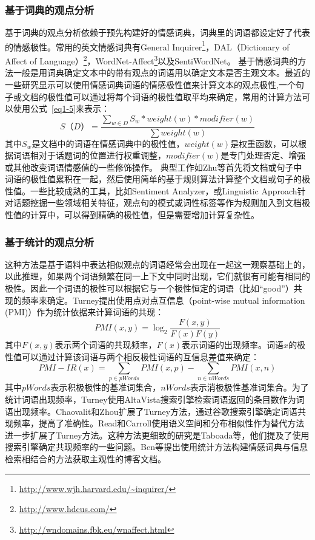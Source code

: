 \subsubsection{基于词典的观点分析}
基于词典的观点分析依赖于预先构建好的情感词典，词典里的词语都设定好了代表的情感极性。常用的英文情感词典有General Inquirer\footnote{\url{http://www.wjh.harvard.edu/~inquirer/}}，DAL（Dictionary of Affect of Language）\footnote{\url{http://www.hdcus.com/}}，WordNet-Affect\footnote{\url{http://wndomains.fbk.eu/wnaffect.html}}以及SentiWordNet。
基于情感词典的方法一般是用词典确定文本中的带有观点的词语用以确定文本是否主观文本。最近的一些研究显示可以使用情感词典词语的情感极性值来计算文本的观点极性,一个句子或文档的极性值可以通过将每个词语的极性值取平均来确定，常用的计算方法可以使用公式~\ref{eq1-5}来表示：
\begin{equation}
\label{eq1-5}
S（D）=\dfrac{\sum_{w \in D}S_w \ast weight(w) \ast modifier(w)}{\sum weight(w)}
\end{equation}
其中$ S_w $是文档中的词语在情感词典中的极性值，$ weight(w) $是权重函数，可以根据词语相对于话题词的位置进行权重调整，$ modifier(w) $是专门处理否定、增强或其他改变词语情感值的一些修饰操作。
典型工作如Zhu等首先将文档或句子中词语的极性值累积在一起，然后使用简单的基于规则算法计算整个文档或句子的极性值。一些比较成熟的工具，比如Sentiment Analyzer，或Linguistic Approach针对话题挖掘一些领域相关特征，观点句的模式或词性标签等作为规则加入到文档极性值的计算中，可以得到精确的极性值，但是需要增加计算复杂性。

\subsubsection{基于统计的观点分析}
这种方法是基于语料中表达相似观点的词语经常会出现在一起这一观察基础上的，以此推理，如果两个词语频繁在同一上下文中同时出现，它们就很有可能有相同的极性。因此一个词语的极性可以根据它与一个极性恒定的词语（比如“good”）共现的频率来确定。Turney提出使用点对点互信息（point-wise mutual information (PMI)）作为统计依据来计算词语的共现：
\begin{equation}
PMI(x,y)=\log_2\dfrac{F(x,y)}{F(x)F(y)}
\end{equation}
其中$ F(x,y) $表示两个词语的共现频率，$ F(x) $表示词语的出现频率。词语$ x $的极性值可以通过计算该词语与两个相反极性词语的互信息差值来确定：
\begin{equation}
PMI-IR(x)=\sum_{p \in pWords}PMI(x,p)-\sum_{n \in nWords}PMI(x,n)
\end{equation}
其中$ pWords $表示积极极性的基准词集合，$ nWords $表示消极极性基准词集合。为了统计词语出现频率，Turney使用AltaVista搜索引擎检索词语返回的条目数作为词语出现频率。Chaovalit和Zhou扩展了Turney方法，通过谷歌搜索引擎确定词语共现频率，提高了准确性。Read和Carroll使用语义空间和分布相似性作为替代方法进一步扩展了Turney方法。这种方法更细致的研究是Taboada等，他们提及了使用搜索引擎确定共现频率的一些问题。Ben等提出使用统计方法构建情感词典与信息检索相结合的方法获取主观性的博客文档。

